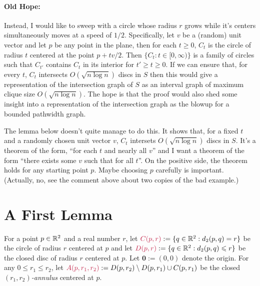 \documentclass{patmorin}
\makeatletter
\renewcommand{\ge}{\geqslant}
\renewcommand{\le}{\leqslant}
\newcommand{\defin}[1]{\emph{\textcolor{brightmaroon}{#1}}}
\def\mathcolor#1#{\@mathcolor{#1}}
\def\@mathcolor#1#2#3{%
  \protect\leavevmode
  \begingroup
    \color#1{#2}#3%
  \endgroup
}
\newcommand{\mathdefin}[1]{\mathcolor{brightmaroon}{#1}}
\makeatother
\begin{document}
\paragraph{Old Hope:}

Instead, I would like to sweep with a circle whose radius $r$ grows while it's centers simultaneously moves at a speed of $1/2$.  Specifically, let $v$ be a (random) unit vector and let $p$ be any point in the plane, then for each $t\ge 0$, $C_t$ is the circle of radius $t$ centered at the point $p+tv/2$. Then $\{C_t: t\in[0,\infty)\}$ is a family of circles such that $C_{t'}$ contains $C_t$ in its interior for $t'\ge t\ge 0$.  If we can ensure that, for every $t$, $C_t$ intersects $O(\sqrt{n\log n})$ discs in $S$ then this would give a representation of the intersection graph of $S$ as an interval graph of maximum clique size $O(\sqrt{n\log n})$.  The hope is that the proof would also shed some insight into a representation of the intersection graph as the blowup for a bounded pathwidth graph.

The lemma below doesn't quite manage to do this.  It shows that, for a fixed $t$ and a randomly chosen unit vector $v$, $C_t$ intersets $O(\sqrt{n\log n})$ discs in $S$.  It's a theorem of the form, ``for each $t$ and nearly all $v$'' and I want a theorem of the form ``there exists some $v$ such that for all $t$''.  On the positive side, the theorem holds for any starting point $p$.  Maybe choosing $p$ carefully is important.  (Actually, no, see the comment above about two copies of the bad example.)



\section{A First Lemma}

For a point $p\in\mathbb{R}^2$ and a real number $r$, let $\mathdefin{C(p,r)}:=\{q\in\R^2: d_2(p,q)=r\}$ be the circle of radius $r$ centered at $p$ and let $\mathdefin{D(p,r)}:=\{q\in\R^2: d_2(p,q)\le r\}$ be the closed disc of radius $r$ centered at $p$.  Let $\mathbf{0}:=(0,0)$ denote the origin.  For any $0\le r_1\le r_2$, let $\mathdefin{A(p,r_1,r_2)}:=D(p,r_2)\setminus D(p,r_1)\cup C(p,r_1)$ be the closed \defin{$(r_1,r_2)$-annulus} centered at $p$.
\end{document}

